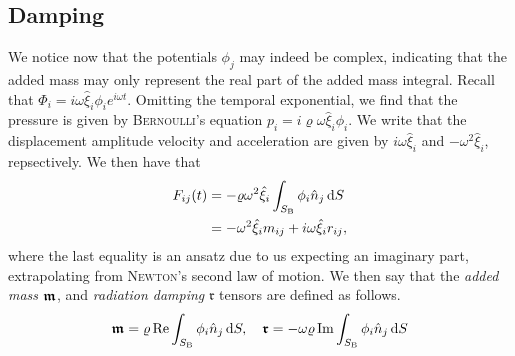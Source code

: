 \subsection{Damping}
We notice now that the potentials $\phi_j$ may indeed be complex, indicating that the added mass may only represent the real part of the added mass integral.
Recall that $\Phi_i = i\omega {\hat{\xi}}_i \phi_i e^{i\omega t}$.
Omitting the temporal exponential, we find that the pressure is given by \textsc{Bernoulli}'s equation $p_i = i \varrho \omega {\hat{\xi}}_i \phi_i$.
We write that the displacement amplitude velocity and acceleration are given by $i\omega {\hat{\xi}}_i$ and $-{\omega}^2 {\hat{\xi}}_i$, repsectively.
We then have that
\begin{equation*}
    \begin{aligned}
        F_{ij} (t) & = -\varrho {\omega}^2 {\hat{\xi}}_{i} \int_{S_{\mathrm{B}}} \phi_i {\hat{n}}_j \,\mathrm{d} S\\
        & = -{\omega}^2 {\hat{\xi}}_i m_{ij} + i\omega {\hat{\xi}}_i r_{ij},
    \end{aligned}
\end{equation*}
where the last equality is an ansatz due to us expecting an imaginary part, extrapolating from \textsc{Newton}'s second law of motion.
We then say that the \emph{added mass} $\bm{\mathfrak{m}}$, and \emph{radiation damping} $\bm{\mathfrak{r}}$ tensors are defined as follows.
\[
    \bm{\mathfrak{m}} = \varrho \operatorname{Re} \int_{S_{\mathrm{B}}} \phi_i {\hat{n}}_j \,\mathrm{d} S, \quad \bm{\mathfrak{r}} = -\omega\varrho \operatorname{Im} \int_{S_{\mathrm{B}}} \phi_i {\hat{n}}_j \,\mathrm{d} S
\]

